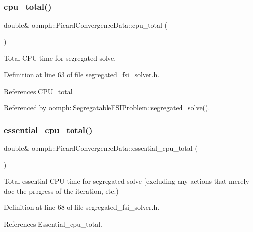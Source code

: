 \subsubsection{\texorpdfstring{cpu\+\_\+total()}{cpu\_total()}}
{\footnotesize\ttfamily double\& oomph\+::\+Picard\+Convergence\+Data\+::cpu\+\_\+total (\begin{DoxyParamCaption}{ }\end{DoxyParamCaption})\hspace{0.3cm}{\ttfamily [inline]}}



Total C\+PU time for segregated solve. 



Definition at line 63 of file segregated\+\_\+fsi\+\_\+solver.\+h.



References C\+P\+U\+\_\+total.



Referenced by oomph\+::\+Segregatable\+F\+S\+I\+Problem\+::segregated\+\_\+solve().

\mbox{\label{classoomph_1_1PicardConvergenceData_abb555813a3773fe0afb86b5097428545}} 
\subsubsection{\texorpdfstring{essential\+\_\+cpu\+\_\+total()}{essential\_cpu\_total()}}
{\footnotesize\ttfamily double\& oomph\+::\+Picard\+Convergence\+Data\+::essential\+\_\+cpu\+\_\+total (\begin{DoxyParamCaption}{ }\end{DoxyParamCaption})\hspace{0.3cm}{\ttfamily [inline]}}



Total essential C\+PU time for segregated solve (excluding any actions that merely doc the progress of the iteration, etc.) 



Definition at line 68 of file segregated\+\_\+fsi\+\_\+solver.\+h.



References Essential\+\_\+cpu\+\_\+total.



